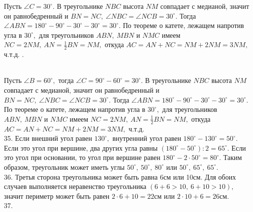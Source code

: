 \documentclass[12pt]{article}
\begin{document}
Пусть $\angle C=30^\circ.$ В треугольнике $NBC$ высота $NM$ совпадает с медианой, значит он равнобедренный и $BN=NC,\ \angle NBC=\angle NCB=30^\circ.$ Тогда $\angle ABN=180^\circ-90^\circ-30^\circ-30^\circ=30^\circ.$ По теореме о катете, лежащем напротив угла в $30^\circ,$ для треугольников $ABN,\ MBN$ и $NMC$ имеем $NC=2NM,\ AN=\frac{1}{2}BN=NM,$ откуда $AC=AN+NC=NM+2NM=3NM,$ ч.т.д.\newpage
{}. \begin{figure}[ht!]
\end{figure}\\
Пусть $\angle B=60^\circ,$ тогда $\angle C=90^\circ-60^\circ=30^\circ.$ В треугольнике $NBC$ высота $NM$ совпадает с медианой, значит он равнобедренный и $BN=NC,\ \angle NBC=\angle NCB=30^\circ.$ Тогда $\angle ABN=180^\circ-90^\circ-30^\circ-30^\circ=30^\circ.$ По теореме о катете, лежащем напротив угла в $30^\circ,$ для треугольников $ABN,\ MBN$ и $NMC$ имеем $NC=2NM,\ AN=\frac{1}{2}BN=NM,$ откуда $AC=AN+NC=NM+2NM=3NM,$ ч.т.д.\\
35. Если внешний угол равен $130^\circ,$ внутренний угол равен $180^\circ-130^\circ=50^\circ.$ Если это угол при вершине, два других угла равны $(180^\circ-50^\circ):2=65^\circ.$ Если это угол при основании, то угол при вершине равен $180^\circ-2\cdot50^\circ=80^\circ.$ Таким образом, треугольник может иметь углы  $50^\circ,\ 50^\circ,\ 80^\circ$ или $50^\circ,\ 65^\circ,\ 65^\circ.$\\
36. Третья сторона треугольника может быть равна 6см или 10см. Для обоих случаев выполняется неравенство треугольника $(6+6>10,\ 6+10>10),$ значит периметр может быть равен $2\cdot6+10=22$см или $2\cdot10+6=26$см.\\
37. \begin{figure}[ht!]
\end{figure}\\
\end{document}
